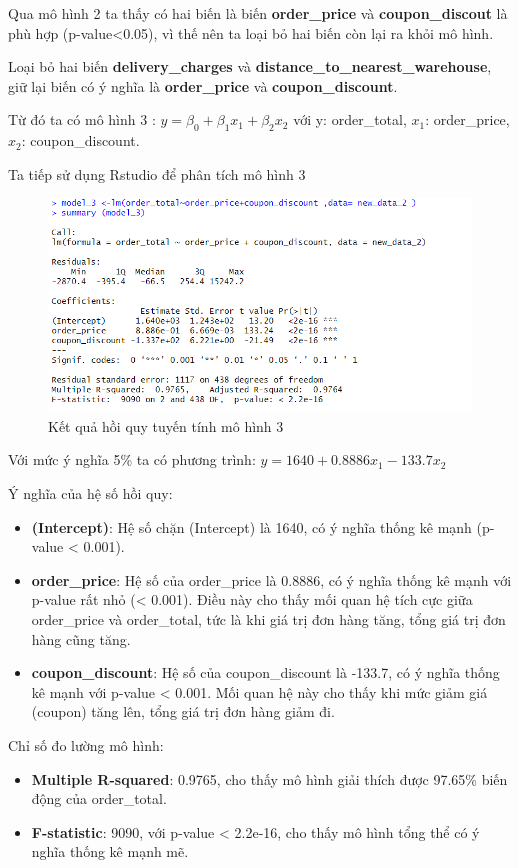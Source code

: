 Qua mô hình 2 ta thấy có hai biến là biến \textbf{order\_price} và \textbf{coupon\_discout} là phù hợp (p-value<0.05), vì thế nên ta loại bỏ hai biến còn lại ra khỏi mô hình.

Loại bỏ hai biến \textbf{delivery\_charges} và \textbf{distance\_to\_nearest\_warehouse}, giữ lại biến có ý nghĩa là \textbf{order\_price} và \textbf{coupon\_discount}.

Từ đó ta có mô hình 3 : $y= \beta_0 + \beta_1x_1 + \beta_2x_2$ với y: order\_total, $x_1$: order\_price, $x_2$: coupon\_discount.

Ta tiếp sử dụng Rstudio để phân tích mô hình 3
\begin{figure}[!htp]
  \centering
  \includegraphics[width=0.7\linewidth]{graphics/5.5.4.png}
  \caption{Kết quả hồi quy tuyến tính mô hình 3 }
\end{figure}

Với mức ý nghĩa 5\% ta có phương trình: $y= 1640 + 0.8886x_1 - 133.7 x_2$

Ý nghĩa của hệ số hồi quy:
\begin{itemize}
\item\textbf{(Intercept)}: Hệ số chặn (Intercept) là 1640, có ý nghĩa thống kê mạnh (p-value < 0.001).
\item\textbf{order\_price}: Hệ số của order\_price là 0.8886, có ý nghĩa thống kê mạnh với p-value rất nhỏ (< 0.001). Điều này cho thấy mối quan hệ tích cực giữa order\_price và order\_total, tức là khi giá trị đơn hàng tăng, tổng giá trị đơn hàng cũng tăng.
\item\textbf{coupon\_discount}: Hệ số của coupon\_discount là -133.7, có ý nghĩa thống kê mạnh với p-value < 0.001. Mối quan hệ này cho thấy khi mức giảm giá (coupon) tăng lên, tổng giá trị đơn hàng giảm đi.
\end{itemize}

Chỉ số đo lường mô hình:

\begin{itemize}
\item\textbf{Multiple R-squared}: 0.9765, cho thấy mô hình giải thích được 97.65\% biến động của order\_total.
\item\textbf{F-statistic}: 9090, với p-value < 2.2e-16, cho thấy mô hình tổng thể có ý nghĩa thống kê mạnh mẽ.
\end{itemize}

